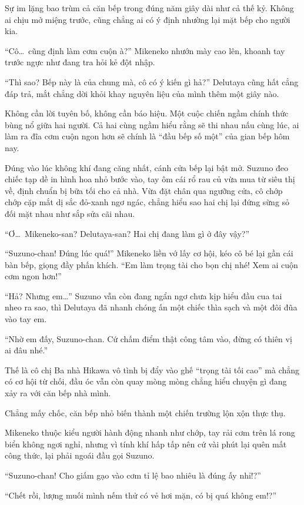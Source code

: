 ﻿\documentclass[../main.tex]{subfiles}
\begin{document}
Sự im lặng bao trùm cả căn bếp trong đúng năm giây dài như cả thế kỷ. Không ai chịu mở miệng trước, cũng chẳng ai có ý định nhường lại mặt bếp cho người kia.

``Cô\dots\ cũng định làm cơm cuộn à?'' Mikeneko nhướn mày cao lên, khoanh tay trước ngực như đang tra hỏi kẻ đột nhập.

``Thì sao? Bếp này là của chung mà, cô có ý kiến gì hả?'' Delutaya cũng hất cẳng đáp trả, mắt chẳng dời khỏi khay nguyên liệu của mình thêm một giây nào.

Không cần lời tuyên bố, không cần báo hiệu. Một cuộc chiến ngầm chính thức bùng nổ giữa hai người. Cả hai cùng ngầm hiểu rằng sẽ thi nhau nấu cùng lúc, ai làm ra đĩa cơm cuộn ngon hơn sẽ chính là ``đầu bếp số một'' của gian bếp hôm nay.

Đúng vào lúc không khí đang căng nhất, cánh cửa bếp lại bật mở. Suzuno đeo chiếc tạp dề in hình hoa nhỏ bước vào, tay ôm cái rổ rau củ vừa mua từ siêu thị về, định chuẩn bị bữa tối cho cả nhà. Vừa đặt chân qua ngưỡng cửa, cô chớp chớp cặp mắt dị sắc đỏ-xanh ngơ ngác, chẳng hiểu sao hai chị lại đứng sừng sỏ đối mặt nhau như sắp sửa cãi nhau.

``Ơ\dots\ Mikeneko-san? Delutaya-san? Hai chị đang làm gì ở đây vậy?''

``Suzuno-chan! Đúng lúc quá!'' Mikeneko liền vớ lấy cơ hội, kéo cô bé lại gần cái bàn bếp, giọng đầy phấn khích. ``Em làm trọng tài cho bọn chị nhé! Xem ai cuộn cơm ngon hơn!''

``Hả? Nhưng em\dots'' Suzuno vẫn còn đang ngẩn ngơ chưa kịp hiểu đầu cua tai nheo ra sao, thì Delutaya đã nhanh chóng ấn một chiếc thìa sạch và một đôi đũa vào tay em.

``Nhờ em đấy, Suzuno-chan. Cứ chấm điểm thật công tâm vào, đừng có thiên vị ai đâu nhé.''

Thế là cô chị Ba nhà Hikawa vô tình bị đẩy vào ghế ``trọng tài tối cao'' mà chẳng có cơ hội từ chối, đầu óc vẫn còn quay mòng mòng chẳng hiểu chuyện gì đang xảy ra với căn bếp nhà mình.

Chẳng mấy chốc, căn bếp nhỏ biến thành một chiến trường lộn xộn thực thụ.

Mikeneko thuộc kiểu người hành động nhanh như chớp, tay rải cơm trên lá rong biển không ngơi nghỉ, nhưng vì tính khí hấp tấp nên cứ vài phút lại quên mất công thức, lại phải ngoái đầu gọi Suzuno.

``Suzuno-chan! Cho giấm gạo vào cơm tỉ lệ bao nhiêu là đúng ấy nhỉ!?''

``Chết rồi, lượng muối mình nếm thử có vẻ hơi mặn, có bị quá không em!?''
\end{document}
